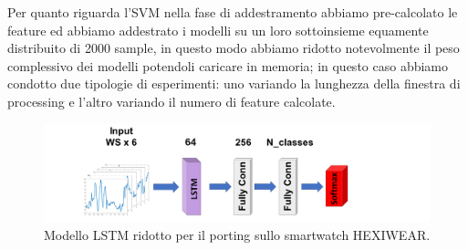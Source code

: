Per quanto riguarda l'SVM nella fase di addestramento abbiamo pre-calcolato le feature ed abbiamo addestrato i modelli su un loro sottoinsieme equamente distribuito di 2000 sample, in questo modo abbiamo ridotto notevolmente il peso complessivo dei modelli potendoli caricare in memoria; in questo caso abbiamo condotto due tipologie di esperimenti: uno variando la lunghezza della finestra di processing e l'altro variando il numero di feature calcolate.

\begin{figure}[!htb]
    \centering
    \includegraphics[width=\textwidth]{figure/lstm_model_64.png}
    \caption{Modello LSTM ridotto per il porting sullo smartwatch HEXIWEAR.}
    \label{fig:lstm-models-port}
\end{figure}